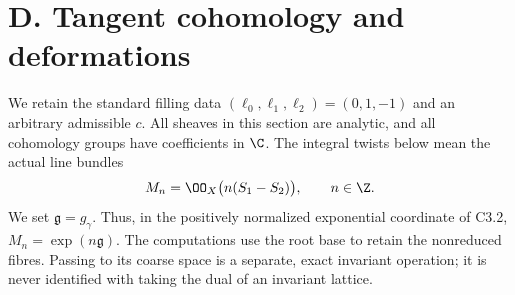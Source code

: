 \section{D. Tangent cohomology and deformations}

We retain the standard filling data $(\ell _0,\ell _1,\ell _2)=(0,1,-1)$
and an arbitrary admissible $c$. All sheaves in this section are analytic,
and all cohomology groups have coefficients in $\C$. The integral twists
below mean the actual line bundles
\[
 M_n=\OO_X\bigl(n(S_1-S_2)\bigr),\qquad n\in\Z.
\]
We set $\mathfrak g=g_\gamma$. Thus, in the positively normalized
exponential coordinate of C3.2,
$M_n=\exp(n\mathfrak g)$. The computations use the root base to retain the
nonreduced fibres. Passing to its coarse space is a separate, exact
invariant operation; it is never identified with taking the dual of an
invariant lattice.

